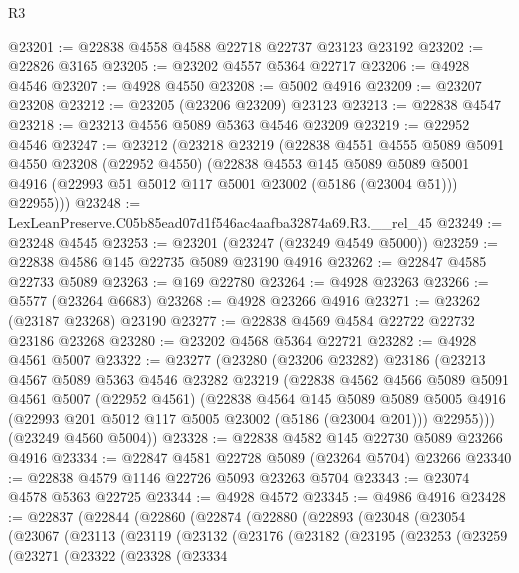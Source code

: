 \begin{lexlean}{R3}
\begin{coremodule}
@23201 := @22838 @4558 @4588 @22718 @22737 @23123 @23192
@23202 := @22826 @3165
@23205 := @23202 @4557 @5364 @22717
@23206 := @4928 @4546
@23207 := @4928 @4550
@23208 := @5002 @4916
@23209 := @23207 @23208
@23212 := @23205 (@23206 @23209) @23123
@23213 := @22838 @4547
@23218 := @23213 @4556 @5089 @5363 @4546 @23209
@23219 := @22952 @4546
@23247 := @23212
    (@23218
      @23219
      (@22838
        @4551
        @4555
        @5089
        @5091
        @4550
        @23208
        (@22952 @4550)
        (@22838
          @4553
          @145
          @5089
          @5089
          @5001
          @4916
          (@22993 @51 @5012 @117 @5001 @23002 (@5186 (@23004 @51)))
          @22955)))
@23248 := LexLeanPreserve.C05b85ead07d1f546ac4aafba32874a69.R3.__rel_45
@23249 := @23248 @4545
@23253 := @23201 (@23247 (@23249 @4549 @5000))
@23259 := @22838 @4586 @145 @22735 @5089 @23190 @4916
@23262 := @22847 @4585 @22733 @5089
@23263 := @169 @22780
@23264 := @4928 @23263
@23266 := @5577 (@23264 @6683)
@23268 := @4928 @23266 @4916
@23271 := @23262 (@23187 @23268) @23190
@23277 := @22838 @4569 @4584 @22722 @22732 @23186 @23268
@23280 := @23202 @4568 @5364 @22721
@23282 := @4928 @4561 @5007
@23322 := @23277
    (@23280
      (@23206 @23282)
      @23186
      (@23213
        @4567
        @5089
        @5363
        @4546
        @23282
        @23219
        (@22838
          @4562
          @4566
          @5089
          @5091
          @4561
          @5007
          (@22952 @4561)
          (@22838
            @4564
            @145
            @5089
            @5089
            @5005
            @4916
            (@22993 @201 @5012 @117 @5005 @23002 (@5186 (@23004 @201)))
            @22955)))
      (@23249 @4560 @5004))
@23328 := @22838 @4582 @145 @22730 @5089 @23266 @4916
@23334 := @22847 @4581 @22728 @5089 (@23264 @5704) @23266
@23340 := @22838 @4579 @1146 @22726 @5093 @23263 @5704
@23343 := @23074 @4578 @5363 @22725
@23344 := @4928 @4572
@23345 := @4986 @4916
@23428 := @22837
    (@22844
      (@22860
        (@22874
          (@22880
            (@22893
              (@23048
                (@23054
                  (@23067
                    (@23113
                      (@23119
                        (@23132
                          (@23176
                            (@23182
                              (@23195
                                (@23253
                                  (@23259
                                    (@23271
                                      (@23322
                                        (@23328
                                          (@23334

\end{coremodule}
\end{lexlean}
